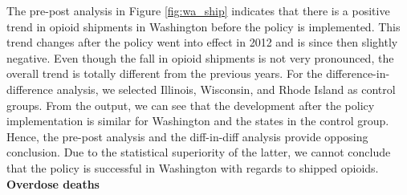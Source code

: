 \documentclass[12pt,letterpaper]{article}
\begin{document}
The pre-post analysis in Figure \ref{fig:wa_ship} indicates that there is a positive trend in opioid shipments in Washington before the policy is implemented. This trend changes after the policy went into effect in 2012 and is since then slightly negative. Even though the fall in opioid shipments is not very pronounced, the overall trend is totally different from the previous years. For the difference-in-difference analysis, we selected Illinois, Wisconsin, and Rhode Island as control groups. From the output, we can see that the development after the policy implementation is similar for Washington and the states in the control group. Hence, the pre-post analysis and the diff-in-diff analysis provide opposing conclusion. Due to the statistical superiority of the latter, we cannot conclude that the policy is successful in Washington with regards to shipped opioids. \\

\noindent \textbf{Overdose deaths}
\end{document}
